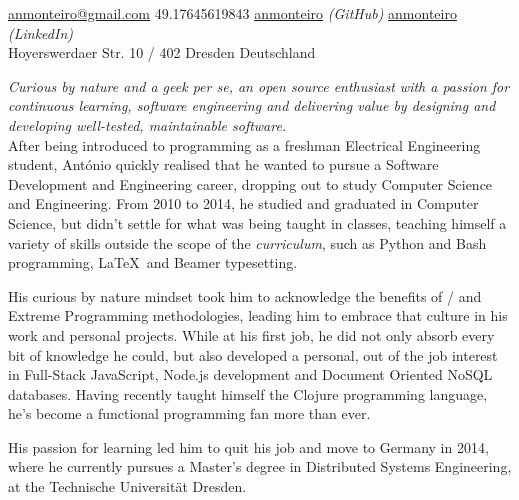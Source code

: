 \documentclass[10pt,a4paper]{article}
\begin{document}
\sloppy  %



\nobreakvspace{0.3em}  %

\noindent\href{mailto:anmonteiro.at.gmail.dot.com}{anmonteiro\mbox{}@\mbox{}gmail.com}\sbull
\textsmaller{+}49.17645619843\sbull
{\newnums \href{http://www.github.com/anmonteiro}{anmonteiro}} \emph{(GitHub)}\sbull
\href{http://www.linkedin.com/in/anmonteiro}{anmonteiro} \emph{(LinkedIn)}
\\
Hoyerswerdaer Str. 10 / 402 Dresden\sbull
Deutschland

\spacedhrule{0.9em}{-0.4em}  %


\vspace{-1.3em}  %
\begin{multicols}{2}  %
\emph{Curious by nature and a geek \emph{per se}, an open source enthusiast with a passion for continuous learning, software engineering and delivering value by designing and developing well-tested, maintainable software.}\\

After being introduced to programming as a freshman Electrical Engineering student, António quickly realised that he wanted to pursue a Software Development and Engineering career, dropping out to study Computer Science and Engineering. From 2010 to 2014, he studied and graduated in Computer Science, but didn't settle for what was being taught in classes, teaching himself a variety of skills outside the scope of the \emph{curriculum}, such as Python and Bash programming, \LaTeX\ and Beamer typesetting.

His curious by nature mindset took him to acknowledge the benefits of / and Extreme Programming methodologies, leading him to embrace that culture in his work and personal projects. While at his first job, he did not only absorb every bit of knowledge he could, but also developed a personal, out of the job interest in Full-Stack JavaScript, Node.js development and Document Oriented NoSQL databases. Having recently taught himself the Clojure programming language, he's become a functional programming fan more than ever.

His passion for learning led him to quit his job and move to Germany in 2014, where he currently pursues a Master's degree in Distributed Systems Engineering, at the Technische Universität Dresden.
\end{multicols}
\end{document}
